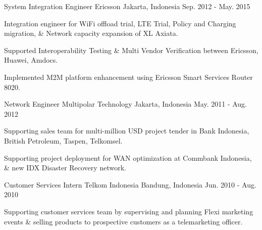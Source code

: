 \begin{cventries}
  \cventry
    {System Integration Engineer} %
    {Ericsson} %
    {Jakarta, Indonesia} %
    {Sep. 2012 - May. 2015} %
    {
      \begin{cvitems} %
        \item {Integration engineer for WiFi offload trial, LTE Trial, Policy and Charging migration, \& Network capacity expansion of XL Axiata.}
        \item {Supported Interoperability Testing \& Multi Vendor Verification between Ericsson, Huawei, Amdocs.}
        \item {Implemented M2M platform enhancement using Ericsson Smart Services Router 8020.}
      \end{cvitems}
    }

  \cventry
    {Network Engineer} %
    {Multipolar Technology} %
    {Jakarta, Indonesia} %
    {May. 2011 - Aug. 2012} %
    {
      \begin{cvitems} %
        \item {Supporting sales team for multi-million USD project tender in Bank Indonesia, British Petroleum, Taspen, Telkomsel.}
        \item {Supporting project deployment for WAN optimization at Commbank Indonesia, \& new IDX Disaster Recovery network.}
      \end{cvitems}
    }

  \cventry
    {Customer Services Intern} %
    {Telkom Indonesia} %
    {Bandung, Indonesia} %
    {Jun. 2010 - Aug. 2010} %
    {
      \begin{cvitems} %
        \item {Supporting customer services team by supervising and planning Flexi marketing events \& selling products to prospective customers as a telemarketing officer.}
      \end{cvitems}
    }

\end{cventries}
